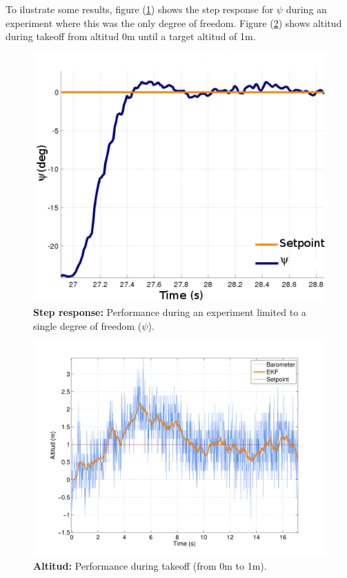 \documentclass[conference]{IEEEtran}
\newcommand{\refp}[1]{(\ref{#1})}
\begin{document}
To ilustrate some results, figure \refp{fig:psi_esc.pdf} shows the step response for $\psi$ during an experiment where this was the only degree of freedom. Figure \refp{fig:altura.pdf} shows altitud during takeoff from altitud 0m until a target altitud of 1m.

\begin{figure}
	\centering
	\includegraphics[width=.9\columnwidth]{./pics_paper/control_escalon_eng.png}
	\caption{\textbf{Step response:} Performance during an experiment limited to a single degree of freedom ($\psi$).}
	\label{fig:psi_esc.pdf}
\end{figure}

\begin{figure}
	\centering
	\includegraphics[width=1\columnwidth]{./pics_paper/altura.pdf}
	\caption{\textbf{Altitud:} Performance during takeoff (from 0m to 1m).}
	\label{fig:altura.pdf}
\end{figure}
\end{document}
